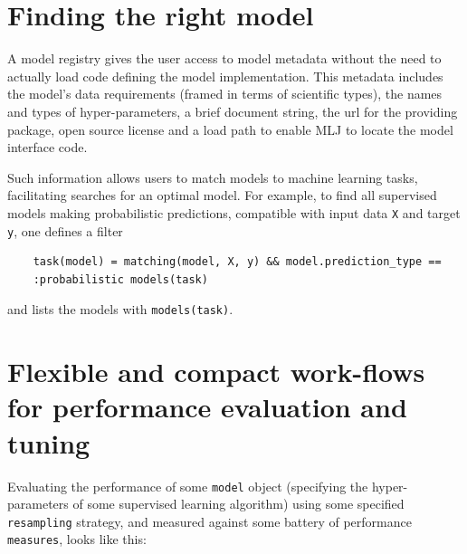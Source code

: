 \documentclass{article}
\begin{document}


\section{Finding the right model}

A model registry gives the user access to model metadata without the
need to actually load code defining the model implementation. This
metadata includes the model's data requirements (framed in terms of
scientific types), the names and types of hyper-parameters, a brief
document string, the url for the providing package, open source
license and a load path to enable MLJ to locate the model interface
code.

Such information allows users to match models to machine learning
tasks, facilitating searches for an optimal model. For example, to
find all supervised models making probabilistic predictions,
compatible with input data \texttt{X} and target \texttt{y}, one
defines a filter

{\tiny
\begin{verbatim}
    task(model) = matching(model, X, y) && model.prediction_type == 
    :probabilistic models(task)
\end{verbatim}
}

and lists the models with \texttt{models(task)}. 

\section{Flexible and compact work-flows for performance evaluation and tuning}

Evaluating the performance of some \texttt{model} object (specifying the hyper-parameters of some supervised learning algorithm) using some specified \texttt{resampling} strategy, and measured against some battery of performance \texttt{measures}, looks like this:
\end{document}
